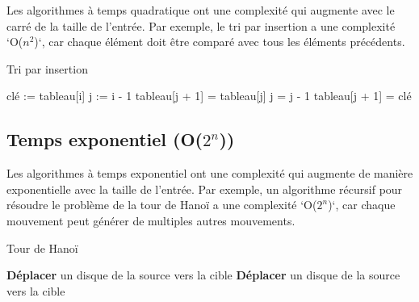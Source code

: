Les algorithmes à temps quadratique ont une complexité qui augmente avec le carré de la taille de l'entrée. Par exemple, le tri par insertion a une complexité `O($n^2$)`, car chaque élément doit être comparé avec tous les éléments précédents.

\begin{algorithm}
	\caption{Tri par insertion}
	\begin{algorithmic}[1]
		\State clé := tableau[i]
		\State j := i - 1
		\State tableau[j + 1] = tableau[j]
		\State j = j - 1
		\EndWhile
		\State tableau[j + 1] = clé
		\EndFor
	\end{algorithmic}
\end{algorithm}

\subsection{Temps exponentiel (O($2^n$))}

Les algorithmes à temps exponentiel ont une complexité qui augmente de manière exponentielle avec la taille de l'entrée. Par exemple, un algorithme récursif pour résoudre le problème de la tour de Hanoï a une complexité `O($2^n$)`, car chaque mouvement peut générer de multiples autres mouvements.

\begin{algorithm}
	\caption{Tour de Hanoï}
	\begin{algorithmic}[1]
		\State \textbf{Déplacer} un disque de la source vers la cible
		\Else
		\State {}
		\State \textbf{Déplacer} un disque de la source vers la cible
		\State {}
		\EndIf
		\EndFunction
	\end{algorithmic}
\end{algorithm}


